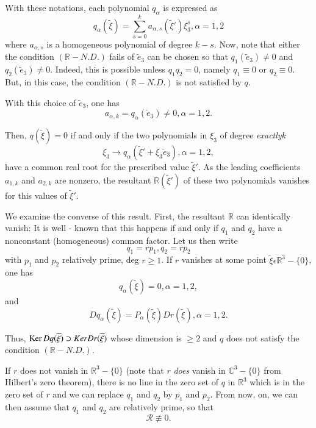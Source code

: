 With these notations, each polynomial $q_{\alpha}$ is expressed as
\begin{equation*}
q_{\alpha}(\widetilde{\xi}) = \sum\limits_{s=0}^{k} a_{\alpha, s} (\widetilde{\xi}') \xi_{3}^{s}, \alpha = 1, 2\tag{A.4}\label{chap5-eqA.4}
\end{equation*}
where $a_{\alpha, s}$ is a homogeneous polynomial of degree $k - s$. Now, note that either the condition $(\mathbb{R} - N. D.)$ fails of $\widetilde{e}_{3}$ can be chosen so that $q_{1}(\widetilde{e}_{3}) \neq 0$ and $q_{2}(\widetilde{e}_{3}) \neq 0$. Indeed, this is possible unless $q_{1}q_{2} = 0$, namely $q_{1} \equiv 0$ or $q_{2} \equiv 0$. But, in this case, the condition $(\mathbb{R}-N.D.)$ is not satisfied by $q$.

With this choice of $\widetilde{e}_{3}$, one has
\begin{equation*}
a_{\alpha, k} = q_{\alpha} (\widetilde{e}_{3}) \neq 0, \alpha = 1, 2.\tag{A.5}\label{chap5-eqA.5}
\end{equation*}

Then, $q(\widetilde{\xi}) = 0$ if and only if the two polynomials in $\xi_{3}$ of degree {\em exactly}\pageoriginale $k$
\begin{equation*}
\xi_{3} \to q_{\alpha} (\widetilde{\xi}' + \xi_{3} \widetilde{e}_{3}), \alpha = 1, 2,\tag{A.6}\label{chap5-eqA.6}
\end{equation*}
have a common real root for the prescribed value $\widetilde{\xi}'$. As the leading coefficients $a_{1, k}$ and $a_{2, k}$ are nonzero, the resultant $\mathbb{R}(\widetilde{\xi}')$ of these two polynomials vanishes for this values of $\widetilde{\xi}'$.

We examine the converse of this result. First, the resultant $\mathbb{R}$ can identically vanish: It is well - known that this happens if and only if $q_{1}$ and $q_{2}$ have a nonconstant (homogeneous) common factor. Let us then write
$$
q_{1} = rp_{1}, q_{2} = rp_{2}
$$
with $p_{1}$ and $p_{2}$ relatively prime, deg $r \geq 1$. If $r$ vanishes at some point $\widetilde{\xi} \epsilon \mathbb{R}^{3} - \{0\}$, one has
$$
q_{\alpha} (\widetilde{\xi}) = 0, \alpha = 1, 2,
$$
and
$$
Dq_{\alpha}(\widetilde{\xi}) = P_{\alpha}(\widetilde{\xi}) Dr(\widetilde{\xi}), \alpha = 1, 2.
$$

Thus, $\operatorname{Ker} Dq(\widetilde{\xi}) \supset Ker Dr(\widetilde{\xi})$ whose dimension is $\geq 2$ and $q$ does not satisfy the condition $(\mathbb{R}-N.D.)$.

If $r$ does not vanish in $\mathbb{R}^{3} - \{0\}$ (note that $r$ {\em does} vanish in $\mathbb{C}^{3} - \{0\}$ from Hilbert's zero theorem), there is no line in the zero set of $q$ in $\mathbb{R}^{3}$ which is in the zero set of $r$ and we can replace $q_{1}$ and $q_{2}$ by $p_{1}$ and $p_{2}$. From now, on, we can then assume that $q_{1}$ and $q_{2}$ are relatively prime, so that
$$
\mathscr{R} \nequiv 0.
$$

